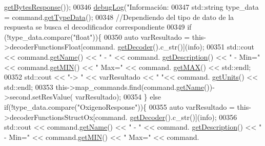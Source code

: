 \begin{DoxyCode}
{{{{{{{{{      \hyperlink{classCommands_a9b3d961dbebbd25f141d18cd5a267738}{getBytesResponse}());
00346                                 \hyperlink{debug_8hpp_a55f41cf7b0585224496de3d7adbc101c}{debugLog}(\textcolor{stringliteral}{"Información: %
00347                                 std::string type\_data = command.\hyperlink{classCommands_a7d983e153465d335db0b3ad7724b8ef6}{getTypeData}();
00348                                 \textcolor{comment}{//Dependiendo del tipo de dato de la respuesta se busca el decodificador
       correspondiente}
00349                                 \textcolor{keywordflow}{if} (!type\_data.compare(\textcolor{stringliteral}{"float"}))\{
00350                                     \textcolor{keyword}{auto} varResultado = this->decoderFunctionsFloat[command.
      \hyperlink{classCommands_a8b4c2a655d8dd3de334338d6684d469c}{getDecoder}().c\_str()](info);
00351                                     std::cout << command.\hyperlink{classCommands_adf3d8a96310b1f4e57a6ecf0f2f153ea}{getName}() << \textcolor{stringliteral}{" - "} << command.
      \hyperlink{classCommands_ad82fe7dfcf1908423bdb59d048020e26}{getDescription}() << \textcolor{stringliteral}{" - Min="} << command.\hyperlink{classCommands_af0a1e2ea65b5a57997c721a8d77a1013}{getMIN}() << \textcolor{stringliteral}{" Max="} << command.
      \hyperlink{classCommands_afbad1051313d0cdecba276384cb7fc6b}{getMAX}() << std::endl;
00352                                     std::cout << \textcolor{stringliteral}{"-> "} << varResultado << \textcolor{stringliteral}{" "}<< command.
      \hyperlink{classCommands_ac67214a4fbd93fbb4d8ebb2dd815a3fa}{getUnits}() << std::endl;
00353                                     this->map\_commands.find(command.\hyperlink{classCommands_adf3d8a96310b1f4e57a6ecf0f2f153ea}{getName}())->second.setResValue(
      varResultado);
00354                                 \} \textcolor{keywordflow}{else} \textcolor{keywordflow}{if}(!type\_data.compare(\textcolor{stringliteral}{"OxigenoResponse"}))\{
00355                                     \textcolor{keyword}{auto} varResultado = this->decoderFunctionsStructOx[command.
      \hyperlink{classCommands_a8b4c2a655d8dd3de334338d6684d469c}{getDecoder}().c\_str()](info);
00356                                     std::cout << command.\hyperlink{classCommands_adf3d8a96310b1f4e57a6ecf0f2f153ea}{getName}() << \textcolor{stringliteral}{" - "} << command.
      \hyperlink{classCommands_ad82fe7dfcf1908423bdb59d048020e26}{getDescription}() << \textcolor{stringliteral}{" - Min="} << command.\hyperlink{classCommands_af0a1e2ea65b5a57997c721a8d77a1013}{getMIN}() << \textcolor{stringliteral}{" Max="} << command.
}}}}}}}}}}
\end{DoxyCode}

